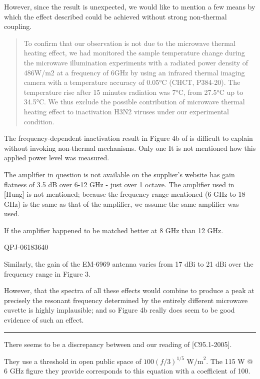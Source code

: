 \documentclass[paper.tex]{subfiles}
\begin{document}
However, since the result is unexpected, we would like to mention a few means by which the effect described could be achieved without strong non-thermal coupling.

\begin{quote}

 To confirm that our observation is not due to the microwave thermal heating effect, we had monitored the sample temperature change during the microwave illumination experiments with a radiated power density of 486W/m2 at a frequency of 6GHz by using an infrared thermal imaging camera with a temperature accuracy of 0.05°C (CHCT, P384-20). The temperature rise after 15 minutes radiation was 7°C, from 27.5°C up to 34.5°C. We thus exclude the possible contribution of microwave thermal heating effect to inactivation H3N2 viruses under our experimental condition.

\end{quote}

The frequency-dependent inactivation result in Figure 4b of \cite{Efficient2015} is difficult to explain without invoking non-thermal mechanisms. Only one  It is not mentioned how this applied power level was measured. 

The amplifier in question is not available on the supplier's website \cite{Microwaved} has gain flatness of 3.5 dB over 6-12 GHz - just over 1 octave. The amplifier used in [Hung] is not mentioned; because the frequency range mentioned (6 GHz to 18 GHz) is the same as that of the amplifier, we assume the same amplifier was used. 

If the amplifier happened to be matched better at 8 GHz than 12 GHz.



QPJ-06183640

Similarly, the gain of the EM-6969 antenna\cite{EM6969} varies from 17 dBi to 21 dBi over the frequency range in Figure 3.

However, that the spectra of all these effects would combine to produce a peak at precisely the resonant frequency determined by the entirely different microwave cuvette is highly implausible; and so Figure 4b really does seem to be good evidence of such an effect.

\clearpage
\rule{\linewidth}{0.2pt}

There seems to be a discrepancy between \cite{Efficient2015} and our reading of [C95.1-2005].

They use a threshold in open public space of $100(f/3)^{1/5} \text{ W/m}^2$. The 115 W @ 6 GHz figure they provide corresponds to this equation with a coefficient of 100.
\end{document}
